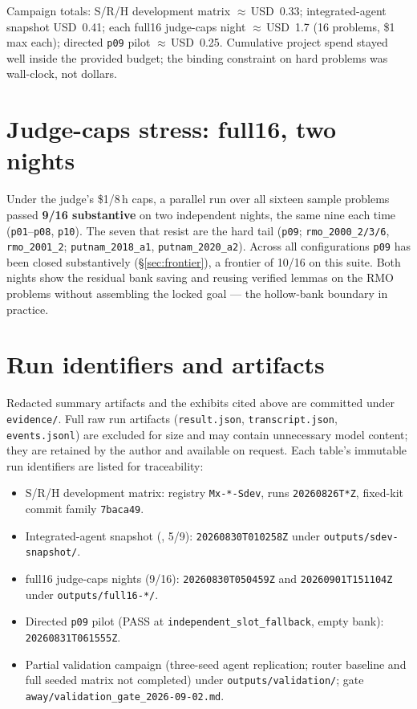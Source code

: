 Campaign totals: S/R/H development matrix $\approx$\,USD~0.33; integrated-agent
snapshot USD~0.41; each full16 judge-caps night $\approx$\,USD~1.7 (16 problems,
\$1 max each); directed \texttt{p09} pilot $\approx$\,USD~0.25. Cumulative project
spend stayed well inside the provided budget; the binding constraint on hard
problems was wall-clock, not dollars.

\section{Judge-caps stress: full16, two nights}
\label{app:full16}

Under the judge's \$1/8\,h caps, a parallel run over all sixteen sample problems
passed \textbf{9/16 substantive} on two independent nights, the same nine each
time (\texttt{p01}--\texttt{p08}, \texttt{p10}). The seven that resist are the hard
tail (\texttt{p09}; \texttt{rmo\_2000\_2/3/6}, \texttt{rmo\_2001\_2};
\texttt{putnam\_2018\_a1}, \texttt{putnam\_2020\_a2}). Across all configurations
\texttt{p09} has been closed substantively (\S\ref{sec:frontier}), a frontier of
10/16 on this suite. Both nights show the residual bank saving and reusing
verified lemmas on the RMO problems without assembling the locked goal --- the
hollow-bank boundary in practice.

\section{Run identifiers and artifacts}
\label{app:runs}

Redacted summary artifacts and the exhibits cited above are committed under
\texttt{evidence/}. Full raw run artifacts (\texttt{result.json},
\texttt{transcript.json}, \texttt{events.jsonl}) are excluded for size and may
contain unnecessary model content; they are retained by the author and available
on request. Each table's immutable run identifiers are listed for traceability:
\sloppy
\begin{itemize}
  \item S/R/H development matrix: registry \texttt{Mx-*-Sdev}, runs
        \texttt{20260826T*Z}, fixed-kit commit family \texttt{7baca49}.
  \item Integrated-agent snapshot (\Sdev, 5/9): \texttt{20260830T010258Z} under
        \texttt{outputs/sdev-snapshot/}.
  \item full16 judge-caps nights (9/16): \texttt{20260830T050459Z} and
        \texttt{20260901T151104Z} under \texttt{outputs/full16-*/}.
  \item Directed \texttt{p09} pilot (PASS at \texttt{independent\_slot\_fallback},
        empty bank): \texttt{20260831T061555Z}.
  \item Partial validation campaign (three-seed agent replication; router baseline
        and full seeded matrix not completed) under \texttt{outputs/validation/};
        gate \texttt{away/validation\_gate\_2026-09-02.md}.
\end{itemize}

